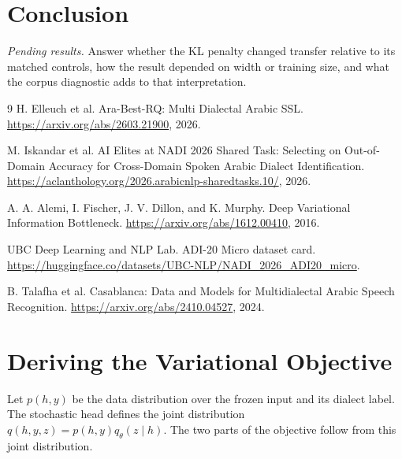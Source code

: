 \documentclass[11pt]{article}
\begin{document}
\section{Conclusion}
\emph{Pending results.} Answer whether the KL penalty changed transfer relative to its matched controls, how the result depended on width or training size, and what the corpus diagnostic adds to that interpretation.


\begin{thebibliography}{9}
H. Elleuch et al.
\newblock Ara-Best-RQ: Multi Dialectal Arabic SSL.
\newblock \url{https://arxiv.org/abs/2603.21900}, 2026.

M. Iskandar et al.
\newblock AI Elites at NADI 2026 Shared Task: Selecting on Out-of-Domain
Accuracy for Cross-Domain Spoken Arabic Dialect Identification.
\newblock \url{https://aclanthology.org/2026.arabicnlp-sharedtasks.10/}, 2026.

A. A. Alemi, I. Fischer, J. V. Dillon, and K. Murphy.
\newblock Deep Variational Information Bottleneck.
\newblock \url{https://arxiv.org/abs/1612.00410}, 2016.

UBC Deep Learning and NLP Lab.
\newblock ADI-20 Micro dataset card.
\newblock \url{https://huggingface.co/datasets/UBC-NLP/NADI_2026_ADI20_micro}.

B. Talafha et al.
\newblock Casablanca: Data and Models for Multidialectal Arabic Speech Recognition.
\newblock \url{https://arxiv.org/abs/2410.04527}, 2024.
\end{thebibliography}


\clearpage
\appendix
\section{Deriving the Variational Objective}
\label{app:vib}
Let \(p(h,y)\) be the data distribution over the frozen input and its dialect
label. The stochastic head defines the joint distribution
\(q(h,y,z)=p(h,y)q_\theta(z\mid h)\). The two parts of the objective follow
from this joint distribution.
\end{document}
